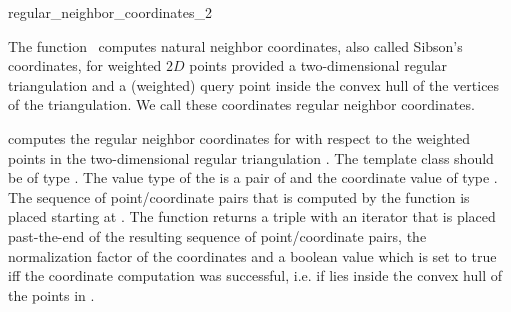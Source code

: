 
\begin{ccRefFunction}{regular_neighbor_coordinates_2}  %

\ccDefinition
  
The function \ccRefName\ computes natural neighbor coordinates, also
called Sibson's coordinates, for weighted $2D$ points provided a
two-dimensional regular triangulation and a (weighted) query point
inside the convex hull of the vertices of the triangulation. We call these 
coordinates regular neighbor coordinates.



 {
  computes the regular neighbor coordinates for  with respect
  to the weighted points in the two-dimensional regular triangulation
  .  The template class  should be of type
  .  The value type of the
   is a pair of  and the
  coordinate value of type . The sequence of
  point/coordinate pairs that is computed by the function is placed
  starting at . The function returns a triple with an
  iterator that is placed past-the-end of the resulting sequence of
  point/coordinate pairs, the normalization factor of the coordinates
  and a boolean value which is set to true iff the coordinate
  computation was successful, i.e. if  lies inside the
  convex hull of the points in . 
  }  


\end{ccRefFunction}
